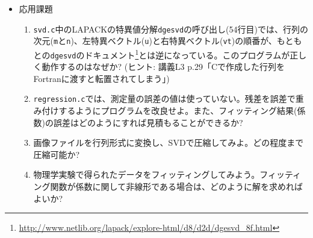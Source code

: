 \documentclass[11pt]{jarticle}
\begin{document}
\begin{itemize}
\item 応用課題
  \begin{enumerate}
  \item {\tt svd.c}中のLAPACKの特異値分解{\tt dgesvd}の呼び出し(54行目)では、行列の次元({\tt m}と{\tt n})、左特異ベクトル({\tt u})と右特異ベクトル({\tt vt})の順番が、もともとの{\tt dgesvd}のドキュメント\footnote{\url{http://www.netlib.org/lapack/explore-html/d8/d2d/dgesvd_8f.html}}とは逆になっている。このプログラムが正しく動作するのはなぜか? (ヒント: 講義L3 p.29「Cで作成した行列をFortranに渡すと転置されてしまう」)
  \item {\tt regression.c}では、測定量の誤差の値は使っていない。残差を誤差で重み付けするようにプログラムを改良せよ。また、フィッティング結果(係数)の誤差はどのようにすれば見積もることができるか?
  \item 画像ファイルを行列形式に変換し、SVDで圧縮してみよ。どの程度まで圧縮可能か?
  \item 物理学実験で得られたデータをフィッティングしてみよう。フィッティング関数が係数に関して非線形である場合は、どのように解を求めればよいか?
  \end{enumerate}  
\end{itemize}
\end{document}
